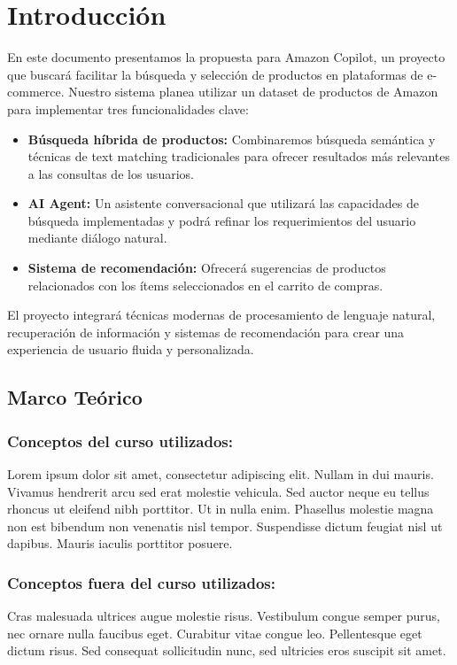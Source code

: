 \documentclass[12pt]{article}
\begin{document}
\section{Introducción}
En este documento presentamos la propuesta para Amazon Copilot, un proyecto que buscará facilitar la búsqueda y selección de productos en plataformas de e-commerce. Nuestro sistema planea utilizar un dataset de productos de Amazon para implementar tres funcionalidades clave:

\begin{itemize}
    \item \textbf{Búsqueda híbrida de productos:} Combinaremos búsqueda semántica y técnicas de text matching tradicionales para ofrecer resultados más relevantes a las consultas de los usuarios.

    \item \textbf{AI Agent:} Un asistente conversacional que utilizará las capacidades
          de búsqueda implementadas y podrá refinar los requerimientos del usuario mediante
          diálogo natural.

    \item \textbf{Sistema de recomendación:} Ofrecerá sugerencias de productos relacionados con los ítems seleccionados en el carrito de compras.
\end{itemize}

El proyecto integrará técnicas modernas de procesamiento de lenguaje natural, recuperación de información y sistemas de recomendación para crear una experiencia de usuario fluida y personalizada.

\subsection{Marco Teórico}

\subsubsection{Conceptos del curso utilizados:}
Lorem ipsum dolor sit amet, consectetur adipiscing elit. Nullam in dui mauris. Vivamus hendrerit arcu sed erat molestie vehicula. Sed auctor neque eu tellus rhoncus ut eleifend nibh porttitor. Ut in nulla enim. Phasellus molestie magna non est bibendum non venenatis nisl tempor. Suspendisse dictum feugiat nisl ut dapibus. Mauris iaculis porttitor posuere.

\subsubsection{Conceptos fuera del curso utilizados:}
Cras malesuada ultrices augue molestie risus. Vestibulum congue semper purus, nec ornare nulla faucibus eget. Curabitur vitae congue leo. Pellentesque eget dictum risus. Sed consequat sollicitudin nunc, sed ultricies eros suscipit sit amet. 
\newpage
\end{document}

